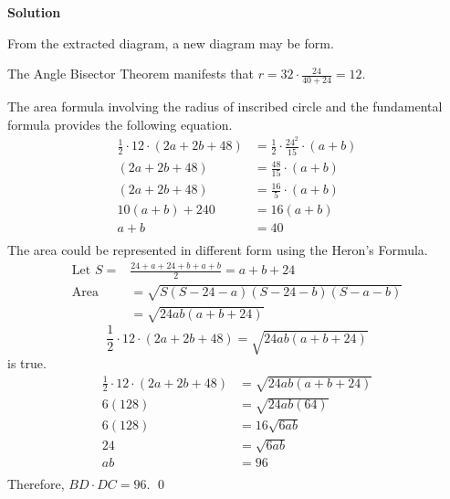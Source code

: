 \documentclass{article}
\newenvironment{solution}{\begin{trivlist}\item[]
{\bf Solution}}{\qed \end{trivlist}}
\begin{document}
\begin{solution}
\begin{center}
\end{center}
From the extracted diagram, a new diagram may be form.
\begin{center}
\end{center}
The Angle Bisector Theorem manifests that
$r = 32 \cdot \frac{24}{40 + 24} = 12$.

The area formula involving the radius of inscribed
circle and the fundamental formula provides the
following equation.
\begin{align*}
    \frac{1}{2} \cdot 12 \cdot (2a + 2b + 48)
    &= \frac{1}{2} \cdot \frac{24^2}{15} \cdot (a + b) \\
    (2a + 2b + 48) &= \frac{48}{15} \cdot (a + b) \\
    (2a + 2b + 48) &= \frac{16}{5} \cdot (a + b) \\
    10(a + b) + 240 &= 16(a + b) \\
    a + b &= 40 \\
\end{align*}
The area could be represented in different form
using the Heron's Formula.
\begin{align*}
    \text{Let } S=
    &\frac{24 + a + 24 + b + a + b}{2} = a + b + 24 \\
    \text{Area}
    &= \sqrt{S(S - 24 - a)(S - 24 - b)(S - a - b)} \\
    &= \sqrt{24ab (a + b + 24)}
\end{align*}
\[
\frac{1}{2} \cdot 12 \cdot (2a + 2b + 48)
= \sqrt{24ab (a + b + 24)}
\]
is true.
\begin{align*}
    \frac{1}{2} \cdot 12 \cdot (2a + 2b + 48)
    &= \sqrt{24ab(a + b + 24)} \\
    6 (128) &= \sqrt{24ab (64)} \\
    6 (128) &= 16 \sqrt{6ab} \\
    24 &= \sqrt{6ab} \\
    ab &= 96 \\
\end{align*}
Therefore, $\boxed{BD \cdot DC = 96}$.
\end{solution}
\end{document}
